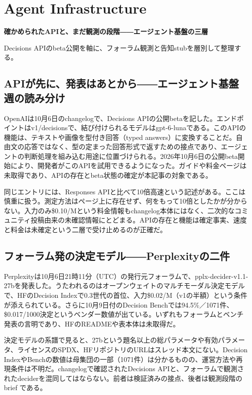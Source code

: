 \section{Agent Infrastructure}
\begin{wideflow}
{\Large\bfseries 確かめられたAPIと、まだ観測の段階――エージェント基盤の三層\par}
\smallskip
{\color{SurveyMuted}Decisions APIのbeta公開を軸に、フォーラム観測と告知stubを層別して整理する。\par}
\end{wideflow}

\subsection*{APIが先に、発表はあとから――エージェント基盤週の読み分け}

OpenAIは10月6日のchangelogで、Decisions APIの公開betaを記した。エンドポイントはv1/decisionsで、結び付けられるモデルはgpt-6-lunaである。このAPIの機能は、テキストや画像を型付き回答（typed answers）に変換することだ。自由文の応答ではなく、型の定まった回答形式で返すための接点であり、エージェントの判断処理を組み込む用途に位置づけられる。2026年10月6日の公開beta開始により、開発者がこのAPIを試用できるようになった。ガイドや料金ページは未取得であり、APIの存在とbeta状態の確定が本記事の対象である。\cite{decisions}

同じエントリには、Responses APIと比べて10倍高速という記述がある。ここは慎重に扱う。測定方法はページ上に存在せず、何をもって10倍としたかが分からない。入力のみ\$0.10/Mという料金情報もchangelog本体にはなく、二次的なコミュニティ投稿由来の未確認情報にとどまる。APIの存在と機能は確定事実、速度と料金は未確定という二層で受け止めるのが正確だ。\cite{decisions}

\subsection*{フォーラム発の決定モデル――Perplexityの二件}

Perplexityは10月6日21時11分（UTC）の発行元フォーラムで、pplx-decider-v1.1-27bを発表した。うたわれるのはオープンウェイトのマルチモーダル決定モデルで、HFのDecision Indexで0.3世代の首位、入力\$0.02/M（v1の半額）という条件が添えられている。さらに10月9日付のDecision Benchでは94.5\%／1071件、\$0.017/1000決定というベンダー数値が出ている。いずれもフォーラムとベンチ発表の言明であり、HFのREADMEや表本体は未取得だ。\cite{pplxdecider}

決定モデルの系譜で見ると、27bという題名以上の総パラメータや有効パラメータ、ライセンスのSPDX、HFリポジトリのURLはスレッド本文にない。Decision IndexやBenchの数値は母集団の一部（1071件）は分かるものの、運営方法や再現条件は不明だ。changelogで確認されたDecisions APIと、フォーラムで観測されたdeciderを混同してはならない。前者は検証済みの接点、後者は観測段階の brief である。\cite{pplxdecider}

